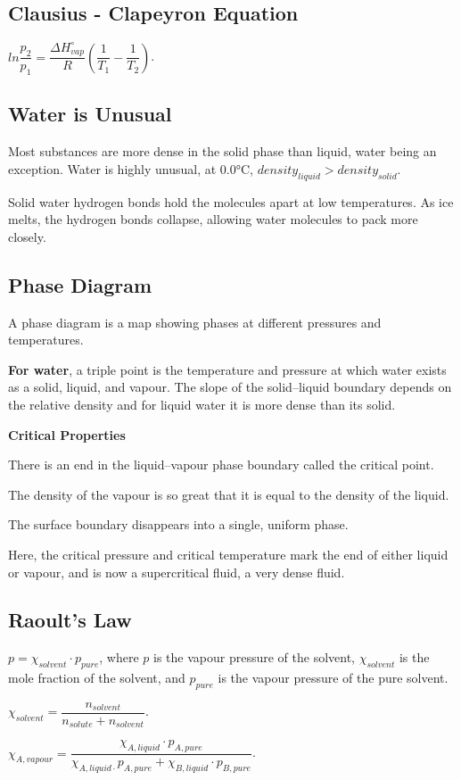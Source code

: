 \documentclass[a4paper,12pt]{article}
\begin{document}
\subsection{Clausius - Clapeyron Equation}
$ln\dfrac{p_{2}}{p_{1}}=\dfrac{\Delta H_{vap}^{\circ}}{R}(\dfrac{1}{T_{1}}-\dfrac{1}{T_{2}})$.
\subsection{Water is Unusual}
Most substances are more dense in the solid phase than liquid, water being an exception. Water is highly unusual, at 0.0°C,  $density_{liquid} > density_{solid}$.\par
Solid water hydrogen bonds hold the molecules apart at low temperatures. As ice melts, the hydrogen bonds collapse, allowing water molecules to pack more closely.
\subsection{Phase Diagram}
A phase diagram is a map showing phases at different pressures and temperatures.\par
\textbf{For water}, a triple point is the temperature and pressure at which water exists as a solid, liquid, and vapour. The slope of the solid–liquid boundary depends on the relative density and for liquid water it is more dense than its solid.\par
\textbf{Critical Properties} \par
There is an end in the liquid–vapour phase boundary called the critical point. \par
The density of the vapour is so great that it is equal to the density of the liquid.\par
 The surface boundary disappears into a single, uniform phase.\par
Here, the critical pressure and critical temperature mark the end of either liquid or vapour, and is now a supercritical fluid, a very dense fluid.
\subsection{Raoult's Law}
$p=\chi_{solvent}\cdot p_{pure}$, where $p$ is the vapour pressure of the solvent, $\chi_{solvent}$ is the mole fraction of the solvent, and $p_{pure}$ is the vapour pressure of the pure solvent.\par
$\chi_{solvent} =\dfrac{n_{solvent}}{n_{solute} + n_{solvent}}$.\par
$\chi_{A,vapour} =\dfrac{\chi_{A,liquid}\cdot p_{A,pure}} {{\chi_{A,liquid\cdot} p_{A,pure} + \chi_{B,liquid}\cdot p_{B,pure}}}$.
\end{document}
